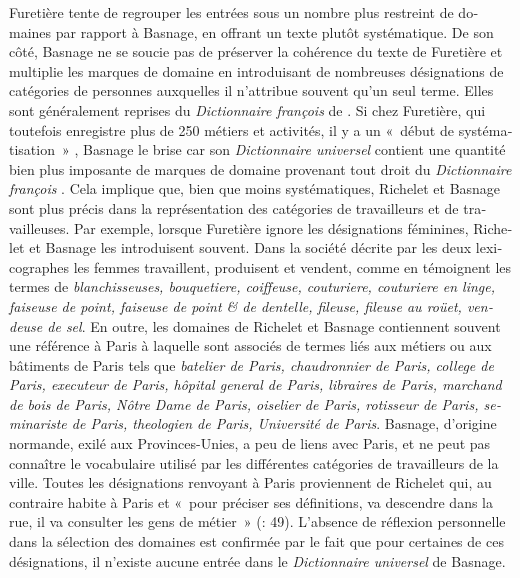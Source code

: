 \documentclass[output=paper,colorlinks,citecolor=brown,arabicfont,chinesefont,booklanguage=french]{langscibook}
\begin{document}
\begin{otherlanguage}{french}
Furetière tente de regrouper les entrées sous un nombre plus restreint de domaines par rapport à Basnage, en offrant un texte plutôt systématique. De son côté, Basnage ne se soucie pas de préserver la cohérence du texte de Furetière et multiplie les marques de domaine en introduisant de nombreuses désignations de catégories de personnes auxquelles il n’attribue souvent qu’un seul terme. Elles sont généralement reprises du \emph{Dictionnaire françois} de \citep{Richelet1693}. Si chez Furetière, qui toutefois enregistre plus de 250 métiers et activités, il y a un «~début de systématisation~» \citet[306]{Quemada1967}, Basnage le brise car son \emph{Dictionnaire universel} contient une quantité bien plus imposante de marques de domaine provenant tout droit du \emph{Dictionnaire françois} \citet{Richelet1693}. Cela implique que, bien que moins systématiques, Richelet et Basnage sont plus précis dans la représentation des catégories de travailleurs et de travailleuses. Par exemple, lorsque Furetière ignore les désignations féminines, Richelet et Basnage les introduisent souvent. Dans la société décrite par les deux lexicographes les femmes travaillent, produisent et vendent, comme en témoignent les termes de \emph{blanchisseuses, bouquetiere, coiffeuse, couturiere, couturiere en linge, faiseuse de point, faiseuse de point \& de dentelle, fileuse, fileuse au roüet, vendeuse de sel}. En outre, les domaines de Richelet et Basnage contiennent souvent une référence à Paris à laquelle sont associés de termes liés aux métiers ou aux bâtiments de Paris tels que \emph{batelier de Paris, chaudronnier de Paris, college de Paris, executeur de Paris, hôpital general de Paris, libraires de Paris, marchand de bois de Paris, Nôtre Dame de Paris, oiselier de Paris, rotisseur de Paris, seminariste de Paris, theologien de Paris, Université de Paris}. Basnage, d'origine normande, exilé aux Provinces-Unies, a peu de liens avec Paris, et ne peut pas connaître le vocabulaire utilisé par les différentes catégories de travailleurs de la ville. Toutes les désignations renvoyant à Paris proviennent de Richelet qui, au contraire habite à Paris et «~pour préciser ses définitions, va descendre dans la rue, il va consulter les gens de métier~» (\citealt{Bray1990}:  49). L'absence de réflexion personnelle dans la sélection des domaines est confirmée par le fait que pour certaines de ces désignations, il n'existe aucune entrée dans le \emph{Dictionnaire universel} de Basnage.


\end{otherlanguage}
\end{document}
